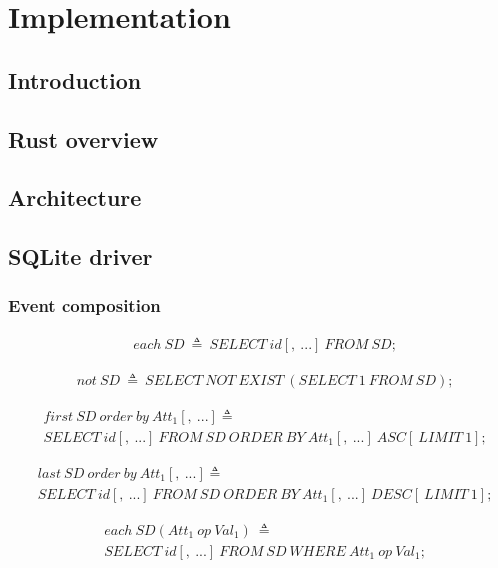\chapter{Implementation}

\section{Introduction}

\section{Rust overview}

\section{Architecture}

\section{SQLite driver}

\subsection{Event composition}
\begin{align*}%
&each\ SD\ \triangleq\ SELECT\ id[,\ ...]\ FROM\ SD;
\end{align*}

\begin{align*}%
&not\ SD\ \triangleq\ SELECT\ NOT\ EXIST\ (SELECT\ 1\ FROM\ SD);
\end{align*}

\begin{align*}%
&first\ SD\ order\ by\ Att_1[,\ ...]\triangleq\\
&SELECT\ id[,\ ...]\ FROM\ SD\ ORDER\ BY\ Att_1[,\ ...]\ ASC[\ LIMIT\ 1];
\end{align*}

\begin{align*}%
&last\ SD\ order\ by\ Att_1[,\ ...]\triangleq\\
&SELECT\ id[,\ ...]\ FROM\ SD\ ORDER\ BY\ Att_1[,\ ...]\ DESC[\ LIMIT\ 1];
\end{align*}

\begin{align*}%
&each\ SD(Att_1\ op \ Val_1)\ \triangleq\\
&SELECT\ id[,\ ...]\ FROM\ SD\ WHERE\ Att_1\ op\ Val_1;
\end{align*}

